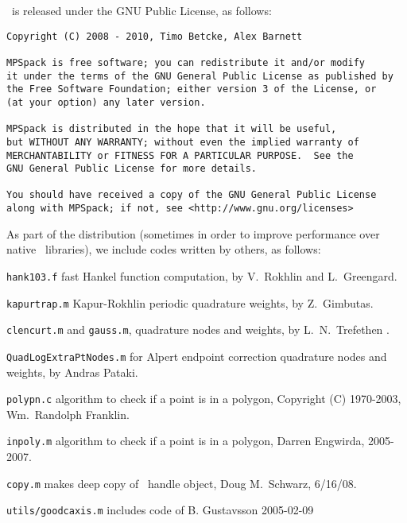 \documentclass[12pt]{article}
\begin{document}
\mpspack\ is released under the GNU Public License, as follows:
\begin{verbatim}
Copyright (C) 2008 - 2010, Timo Betcke, Alex Barnett

MPSpack is free software; you can redistribute it and/or modify
it under the terms of the GNU General Public License as published by
the Free Software Foundation; either version 3 of the License, or
(at your option) any later version.

MPSpack is distributed in the hope that it will be useful,
but WITHOUT ANY WARRANTY; without even the implied warranty of
MERCHANTABILITY or FITNESS FOR A PARTICULAR PURPOSE.  See the
GNU General Public License for more details.

You should have received a copy of the GNU General Public License
along with MPSpack; if not, see <http://www.gnu.org/licenses>
\end{verbatim}

As part of the distribution (sometimes in order to
improve performance over native \matlab\ libraries),
we include codes written by others, as follows:
\bi
\item {\tt hank103.f} fast Hankel function computation, by
V.~Rokhlin and L.~Greengard.
\item {\tt kapurtrap.m} Kapur-Rokhlin periodic quadrature weights,
by Z.~Gimbutas.
\item {\tt clencurt.m} and {\tt gauss.m}, quadrature nodes and weights,
by L.~N.~Trefethen \cite{tref}.
\item {\tt QuadLogExtraPtNodes.m} for Alpert endpoint correction
quadrature nodes and weights, by Andras Pataki.
\item {\tt polypn.c} algorithm to check if a point is in a polygon,
Copyright (C) 1970-2003, Wm.~Randolph Franklin.
\item {\tt inpoly.m} algorithm to check if a point is in a polygon,
Darren Engwirda, 2005-2007.
\item {\tt copy.m} makes deep copy of \matlab\ handle object,
Doug M.~Schwarz, 6/16/08.
\item {\tt utils/goodcaxis.m} includes code of B. Gustavsson 2005-02-09
\ei





 

\end{document}

